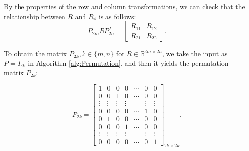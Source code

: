 \documentclass[12pt]{article}
\numberwithin{equation}{section}
\begin{document}
 \fi

By the properties of the row and column transformations, we can check that the relationship between $R$ and $R_4$ is as follows:
\begin{equation}\label{eq:Rn}
    P_{2m} R P_{2n}^T = \begin{bmatrix} R_{11} & R_{12}\\R_{21}& R_{22}\end{bmatrix}.
\end{equation}

To obtain the matrix $P_{2k}, k\in \{m,n\}$ for $R \in \mathbb{R}^{2m \times 2n}$, we take the input as $P=I_{2k}$ in Algorithm \cref{alg:Permutation}, and then it yields the permutation matrix $P_{2k}$:

\begin{equation}\label{p}
    P_{2k} = \begin{bmatrix} 
            1 & 0 & 0 & 0 & \cdots & 0 & 0\\ 
            0 & 0 & 1 & 0 & \cdots & 0 & 0\\ 
            \vdots & \vdots & \vdots & \vdots &  & \vdots & \vdots\\ 
            0 & 0 & 0 & 0 & \cdots & 1 & 0 \\
            0 & 1 & 0 & 0 & \cdots & 0 & 0\\ 
            0 & 0 & 0 & 1 & \cdots & 0 & 0\\ 
            \vdots & \vdots & \vdots & \vdots &  & \vdots & \vdots\\ 
            0 & 0 & 0 & 0 &\cdots & 0 & 1 
        \end{bmatrix}_{2k \times 2k}.
\end{equation}
\end{document}
